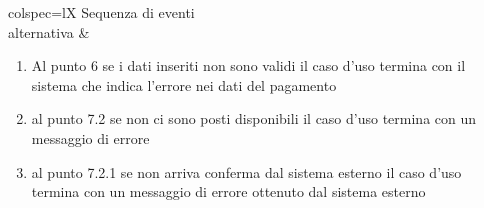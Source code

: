 \begin{table}[!hbp]
\begin{scenery}{colspec=lX}
		{Sequenza di eventi \\ alternativa} &
			\begin{enumerate}[label=\arabic*.]
				\item Al punto 6 se i dati inseriti non sono validi il caso d'uso termina con il sistema che indica l'errore nei dati del pagamento
				\item al punto 7.2 se non ci sono posti disponibili il caso d'uso termina con un messaggio di errore
				\item al punto 7.2.1 se non arriva conferma dal sistema esterno il caso d'uso termina con un messaggio di errore ottenuto dal sistema esterno
			\end{enumerate} \\
	\end{scenery}
\end{table}
